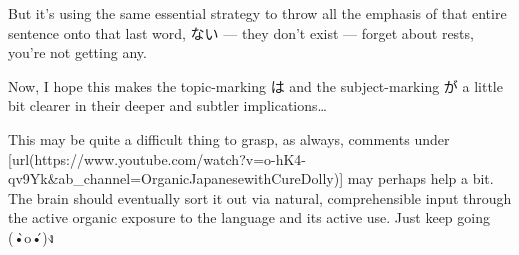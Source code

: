 But it's using the same essential strategy to throw all the emphasis of that entire sentence onto that last word, ない --- they don't exist --- forget about rests, you're not getting any.

Now, I hope this makes the topic-marking は and the subject-marking が a little bit clearer in their deeper and subtler implications\ldots{}

This may be quite a difficult thing to grasp, as always, comments under [url(https://www.youtube.com/watch?v=o-hK4-qv9Yk&ab_channel=OrganicJapanesewithCureDolly)] may perhaps help a bit. The brain should eventually sort it out via natural, comprehensible input through the active organic exposure to the language and its active use. Just keep going (•̀o•́)ง

\stopsectionlevel
